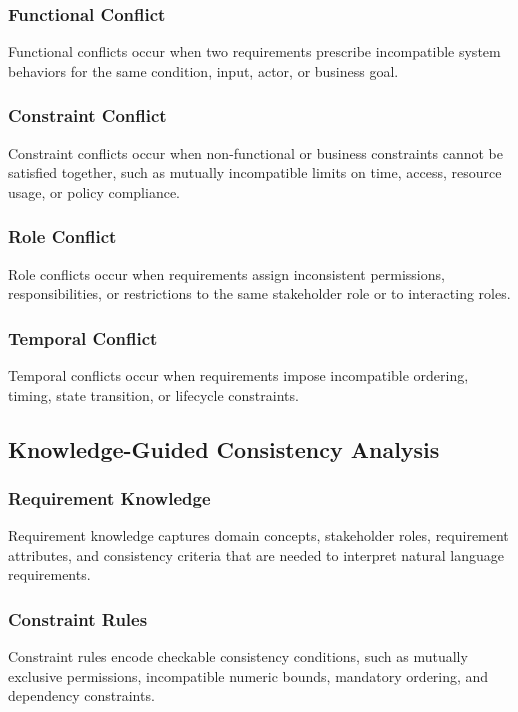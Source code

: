 \subsubsection{Functional Conflict}
Functional conflicts occur when two requirements prescribe incompatible system
behaviors for the same condition, input, actor, or business goal.

\subsubsection{Constraint Conflict}
Constraint conflicts occur when non-functional or business constraints cannot be
satisfied together, such as mutually incompatible limits on time, access, resource
usage, or policy compliance.

\subsubsection{Role Conflict}
Role conflicts occur when requirements assign inconsistent permissions,
responsibilities, or restrictions to the same stakeholder role or to interacting
roles.

\subsubsection{Temporal Conflict}
Temporal conflicts occur when requirements impose incompatible ordering, timing,
state transition, or lifecycle constraints.

\subsection{Knowledge-Guided Consistency Analysis}

\subsubsection{Requirement Knowledge}
Requirement knowledge captures domain concepts, stakeholder roles, requirement
attributes, and consistency criteria that are needed to interpret natural language
requirements.

\subsubsection{Constraint Rules}
Constraint rules encode checkable consistency conditions, such as mutually exclusive
permissions, incompatible numeric bounds, mandatory ordering, and dependency
constraints.

